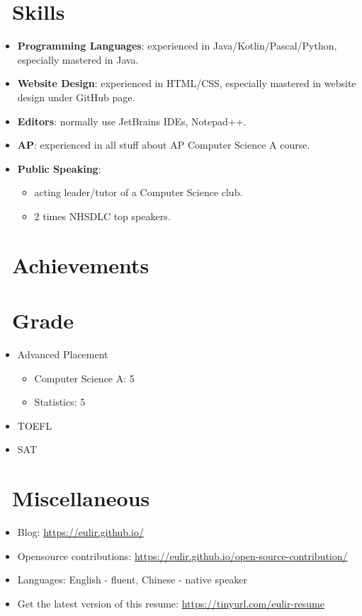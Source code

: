 \documentclass{resume}
\begin{document}
\section{\faCogs\ Skills}
\begin{itemize}[parsep=0.5ex]
  \item \textbf{Programming Languages}:
    experienced in Java/Kotlin/Pascal/Python, especially mastered in Java.
  \item \textbf{Website Design}:
	experienced in HTML/CSS, especially mastered in website design under GitHub page.
  \item \textbf{Editors}:
    normally use JetBrains IDEs, Notepad++.
  \item \textbf{AP}:
    experienced in all stuff about AP Computer Science A course.
  \item \textbf{Public Speaking}:
	\begin{itemize}[parsep=0.5ex]
	  \item acting leader/tutor of a Computer Science club.
	  \item 2 times NHSDLC top speakers.
	\end{itemize}
\end{itemize}

\section{\faHeartO\ Achievements}

\section{\faUsers\ Grade}
\begin{itemize}[parsep=0.5ex]
  \item Advanced Placement
	  \begin{itemize}[parsep=0.5ex]
		  \item Computer Science A: 5
		  \item Statistics: 5
	  \end{itemize}
  \item TOEFL
  \item SAT
\end{itemize}	

\section{\faInfo\ Miscellaneous}
\begin{itemize}[parsep=0.5ex]
  \item Blog: \url{https://eulir.github.io/}
  \item Opensource contributions: \url{https://eulir.github.io/open-source-contribution/} \\
  \item Languages: English - fluent, Chinese - native speaker
  \item Get the latest version of this resume: \url{https://tinyurl.com/eulir-resume}
\end{itemize}
\end{document}
